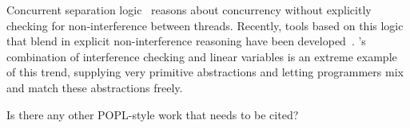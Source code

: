 Concurrent separation logic~\cite{OHearn07} reasons about concurrency without 
explicitly checking for non-interference between threads. 
Recently, tools based on this logic that blend in explicit non-interference reasoning have been developed~\cite{SAGL,RGSep}. 
\civl's combination of interference checking and linear variables is an extreme example of this trend,
supplying very primitive abstractions and letting programmers mix and match these abstractions freely.

Is there any other POPL-style work that needs to be cited?



